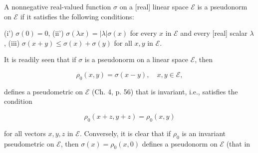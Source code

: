 A nonnegative real-valued function $\sigma$ on a [real] linear space $\mathcal{E}$ is a pseudonorm on $\mathcal{E}$ if it satisfies the following conditions:

(i') $\sigma(0) = 0$,
(ii') $\sigma(\lambda x) = |\lambda| \sigma(x)$ for every $x$ in $\mathcal{E}$ and every [real] scalar $\lambda$,
(iii) $\sigma(x + y) \leq \sigma(x) + \sigma(y)$ for all $x, y$ in $\mathcal{E}$.

It is readily seen that if $\sigma$ is a pseudonorm on a linear space $\mathcal{E}$, then

$$\rho_0(x, y) = \sigma(x - y), \quad x, y \in \mathcal{E},$$

defines a pseudometric on $\mathcal{E}$ (Ch. 4, p. 56) that is invariant, i.e., satisfies the condition

$$\rho_0(x + z, y + z) = \rho_0(x, y)$$

for all vectors $x, y, z$ in $\mathcal{E}$. Conversely, it is clear that if $\rho_0$ is an invariant pseudometric on $\mathcal{E}$, then $\sigma(x) = \rho_0(x, 0)$ defines a pseudonorm on $\mathcal{E}$ (that in
